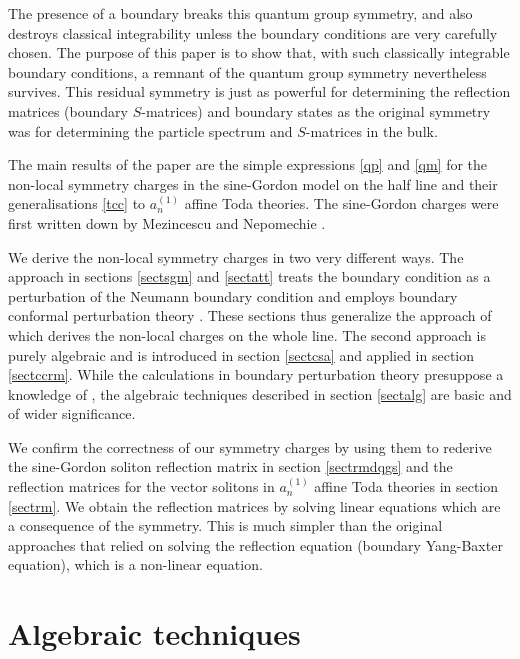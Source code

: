 \documentclass[a4paper,12pt]{article}
\numberwithin{equation}{section}
\begin{document}
The presence of a boundary breaks this quantum group symmetry, and
also destroys classical integrability unless the boundary
conditions are very carefully chosen. The purpose of this paper is
to show that, with such classically integrable boundary
conditions, a remnant of the quantum group symmetry nevertheless
survives. This residual symmetry is just as powerful for
determining the reflection matrices (boundary $S$-matrices) and
boundary states as the original symmetry was for determining the
particle spectrum and $S$-matrices in the bulk.

The main results of the paper are the simple expressions
\eqref{qp} and \eqref{qm} for the non-local symmetry charges in
the sine-Gordon model on the half line and their generalisations
\eqref{tcc} to $a_n^{(1)}$ affine Toda theories. The sine-Gordon
charges were first written down by Mezincescu and Nepomechie
\cite{Mez98}.

We derive the non-local symmetry charges in two very different
ways. The approach in sections \ref{sectsgm} and \ref{sectatt}
treats the boundary condition as a perturbation of the Neumann
boundary condition and employs boundary conformal perturbation
theory \cite{Gho94}. These sections thus generalize the approach
of \cite{Ber91} which derives the non-local charges on the whole
line. The second approach is purely algebraic and is introduced in
section \ref{sectcsa} and applied in section \ref{sectccrm}. While
the calculations in boundary perturbation theory presuppose a
knowledge of \cite{Ber91}, the algebraic techniques described in
section \ref{sectalg} are basic and of wider significance.


We confirm the correctness of our symmetry charges by using them
to rederive the sine-Gordon soliton reflection matrix \cite{Gho94}
in section \ref{sectrmdqgs} and the reflection matrices for the
vector solitons in $a_n^{(1)}$ affine Toda theories \cite{Gan99b}
in section \ref{sectrm}. We obtain the reflection matrices by
solving linear equations which are a consequence of the symmetry.
This is much simpler than the original approaches that relied on
solving the reflection equation \cite{Che84} (boundary Yang-Baxter
equation), which is a non-linear equation.





\section{Algebraic techniques\label{sectalg}}
\end{document}
